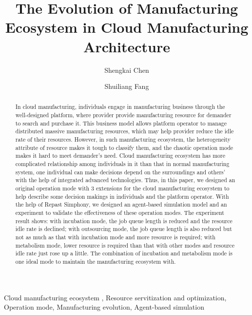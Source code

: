 
\title{The Evolution of Manufacturing Ecosystem in Cloud Manufacturing Architecture
}

\author[add1]{Shengkai Chen}
\author[add1,add2]{Shuiliang Fang}
\address[add2]{The State Key Laboratory of Fluid Power Transmission and Control, College of Mechanical Engineering, Zhejiang University, Hangzhou, 310027, China}
\address[add1]{Key Laboratory of Advanced Manufacturing Technology of Zhejiang Province, College of Mechanical Engineering, Zhejiang University, Hangzhou , 310027, China}



\begin{abstract}
In cloud manufacturing, individuals engage in manufacturing business through the well-designed platform, where provider provide manufacturing resource for demander to search and purchase it. This business model allows platform operator to manage distributed massive manufacturing resources, which may help provider reduce the idle rate of their resources.
However, in such manufacturing ecosystem, the heterogeneity attribute of resource makes it tough to classify them, and the chaotic operation mode makes it hard to meet demander's need.
Cloud manufacturing ecosystem has more complicated relationship among individuals in it than that in normal manufacturing system, one individual can make decisions depend on the surroundings and others' with the help of integrated advanced technologies. Thus, in this paper, we designed an original operation mode with 3 extensions for the cloud manufacturing ecosystem to help describe some decision makings in individuals and the platform operator.
With the help of Repast Simphony, we designed an agent-based simulation model and an experiment to validate the effectiveness of these operation modes. The experiment result shows: with incubation mode, the job queue length is reduced and the resource idle rate is declined; with outsourcing mode, the job queue length is also reduced but not as much as that with incubation mode and more resource is required; with metabolism mode, lower resource is required than that with other modes and resource idle rate just rose up a little. The combination of incubation and metabolism mode is one ideal mode to maintain the manufacturing ecosystem with.
\end{abstract}

\begin{keyword}
Cloud manufacturing ecosystem \sep
Resource servitization and optimization\sep
Operation mode\sep
Manufacturing evolution\sep
Agent-based simulation

\end{keyword}
